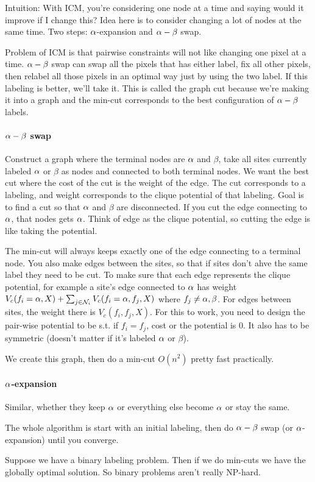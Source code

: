 Intuition: With ICM, you're considering one node at a time and saying
would it improve if I change this? Idea here is to consider changing a
lot of nodes at the same time.
Two steps: $\alpha$-expansion and $\alpha-\beta$ swap.

Problem of ICM is that pairwise constraints will not like changing one
pixel at a time. $\alpha-\beta$ swap can swap all the pixels that has
either label, fix all other pixels, then relabel all those pixels in an optimal way just by using
the two label. If this labeling is better, we'll take it.
This is called the graph cut because we're making it into a graph and
the min-cut corresponds to the best configuration of $\alpha-\beta$
labels.

\paragraph{$\alpha-\beta$ swap}
Construct a graph where the terminal nodes are $\alpha$ and $\beta$, take
all sites currently labeled $\alpha$ or $\beta$ as nodes and connected to
both terminal nodes. We want the best cut where the cost of the cut is the weight of the edge. The
cut corresponds to a labeling, and weight corresponds to the clique
potential of that labeling.
Goal is to find a cut so that $\alpha$ and $\beta$ are disconnected. If you cut the edge connecting to $\alpha$, that nodes gets $\alpha$. Think
 of edge as the clique potential, so cutting the edge is like taking
 the potential.

The min-cut will always keeps exactly one of the edge connecting to a
terminal node. You also make edges between the sites, so that if sites
don't ahve the same label they need to be cut.
To make sure that each edge represents the clique potential, for
example a site's edge connected to $\alpha$ has weight $V_c(f_i
= \alpha, X) + \sum_{j\in \mathcal{N}_i} V_c(f_i=\alpha, f_j, X)$ where
$f_j\neq \alpha, \beta$. For edges between sites, the weight there is
$V_c(f_i, f_j, X)$. For this to work, you need to design the pair-wise
potential to be s.t. if $f_i = f_j$, cost or the potential is 0. It
also has to be symmetric (doesn't matter if it's labeled $\alpha$ or
$\beta$). 

We create this graph, then do a min-cut $O(n^2)$ pretty fast
practically.

\paragraph{$\alpha$-expansion}
\label{sec:ah-expansion}
Similar, whether they keep $\alpha$ or everything else become $\alpha$ or
stay the same.

The whole algorithm is start with an initial labeling, then do
$\alpha-\beta$ swap (or $\alpha$-expansion) until you converge.

Suppose we have a binary labeling problem. Then if we do min-cuts we
have the globally optimal solution. So binary problems aren't really NP-hard.

\pagebreak
\pagebreak
\pagebreak


